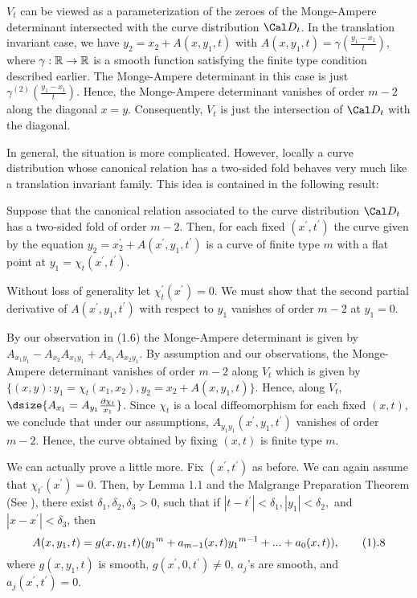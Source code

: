 $V_t$ can be viewed as a parameterization of the zeroes of the Monge-Ampere
determinant intersected with the curve distribution ${\Cal D_t}$. 
In the translation invariant case, we have 
$y_2=x_2+A(x,y_1,t)$ with $A(x,y_1,t)=\gamma(\frac{y_1-x_1}{t})$, where
$\gamma:{\Bbb R} \rightarrow {\Bbb R}$ is a smooth function satisfying the
finite type condition described earlier. The Monge-Ampere
determinant in this case is just ${\gamma}^{(2)}(\frac{y_1-x_1}{t})$. Hence,
the Monge-Ampere determinant vanishes of order $m-2$ along the diagonal 
$x=y$. Consequently, $V_t$ is just the intersection of ${\Cal D_t}$ 
with the diagonal. 

In general, the situation is more complicated. However, locally a curve
distribution whose canonical relation has a two-sided fold behaves very
much like a translation invariant family. This idea is contained in the
following result:

 Suppose that the canonical relation associated to the
curve distribution ${\Cal D_t}$ has a two-sided fold of order $m-2$. Then,
for each fixed $({x}^{\prime},{t}^{\prime})$ the curve given by the equation 
$y_2={x}^{\prime}_2+A({x}^{\prime},y_1,{t}^{\prime})$ is a 
curve of finite type $m$ with a flat point at
$y_1={\chi}_t({x}^{\prime},{t}^{\prime})$. 
\endproclaim  

 Without loss of generality let 
${\chi}_{t}^{\prime}({x}^{\prime})=0$. We must show that the second partial
derivative of $A({x}^{\prime},y_1,{t}^{\prime})$ with respect to $y_1$ 
vanishes of order $m-2$ at $y_1=0$. 

By our observation in (1.6) the Monge-Ampere determinant is given by
\newline 
$A_{x_1 y_1}-A_{x_2}A_{x_1 y_1}+A_{x_1}A_{x_2 y_1}.$ By assumption and
our observations, the Monge-Ampere determinant vanishes of order $m-2$
along $V_t$ which is given by
$ \{(x,y): y_1={\chi}_t(x_1,x_2), y_2=x_2+A(x,y_1,t) \}$. Hence,
along $V_t$, $\dsize{A_{x_1}=A_{y_1} \frac{\partial {\chi}_t}{x_1}}$. Since 
${\chi}_t$ is a local diffeomorphism for each fixed $(x,t)$, we conclude
that under our assumptions, $A_{y_1 y_1}({x}^{\prime},y_1,{t}^{\prime})$
vanishes of order $m-2$. Hence, the curve obtained by fixing $(x,t)$ is
finite type $m$. \enddemo

We can actually prove a little more. Fix $({x}^{\prime},{t}^{\prime})$ as
before. We can again assume that ${\chi}_{{t}^{\prime}}({x}^{\prime})=0$. 
Then, by Lemma 1.1 and the Malgrange Preparation Theorem
(See \cite{Hor1}),  
there exist ${\delta}_1,{\delta}_2,{\delta}_3>0$,
such that if $|t-{t}^{\prime}|<{\delta}_1, |y_1|<{\delta}_2,$ and
$|x-{x}^{\prime}|<{\delta}_3$, then 
$$ A(x,y_1,t)=g(x,y_1,t)({y_1}^m+a_{m-1}(x,t){y_1}^{m-1}+...+a_0(x,t)), 
\tag1.8$$
where $g(x,{y_1},t)$ is smooth, $g({x}^{\prime},0,{t}^{\prime})\not=0$, 
$a_j$'s are smooth, and
$a_j({x}^{\prime},{t}^{\prime})=0$.   

